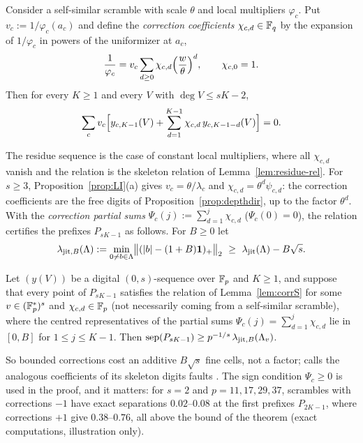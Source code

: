 \begin{lemma}\label{lem:corrS}
Consider a self-similar scramble with scale $\theta$ and local multipliers $\varphi_c$. Put $v_c:=1/\varphi_c(a_c)$ and define the \emph{correction coefficients} $\chi_{c,d}\in\mathbb{F}_q$ by the expansion of $1/\varphi_c$ in powers of the uniformizer at $a_c$,
\[
\frac1{\varphi_c}=v_c\sum_{d\ge0}\chi_{c,d}\Bigl(\frac w\theta\Bigr)^d,\qquad\chi_{c,0}=1 .
\]
Then for every $K\ge1$ and every $V$ with $\deg V\le sK-2$,
\[
\sum_cv_c\Bigl[y_{c,K-1}(V)+\sum_{d=1}^{K-1}\chi_{c,d}\,y_{c,K-1-d}(V)\Bigr]=0 .
\]
\end{lemma}
The residue sequence is the case of constant local multipliers, where all $\chi_{c,d}$ vanish and the relation is the skeleton relation of Lemma~\ref{lem:residue-rel}. For $s\ge3$, Proposition~\ref{prop:LI}(a) gives $v_c=\theta/\lambda_c$ and $\chi_{c,d}=\theta^d\psi_{c,d}$: the correction coefficients are the free digits of Proposition~\ref{prop:depthdir}, up to the factor $\theta^d$. With the \emph{correction partial sums} $\Psi_c(j):=\sum_{d=1}^j\chi_{c,d}$ ($\Psi_c(0)=0$), the relation certifies the prefixes $P_{sK-1}$ as follows. For $B\ge0$ let
\[
\ljitB(\Lambda):=\min_{0\ne b\in\Lambda}\bigl\|(|b|-(1+B)\mathbf 1)_+\bigr\|_2\ \ge\ \ljit(\Lambda)-B\sqrt s .
\]

\begin{theorem}\label{thm:corrected}
Let $(y(V))$ be a digital $(0,s)$-sequence over $\mathbb{F}_p$ and $K\ge1$, and suppose that every point of $P_{sK-1}$ satisfies the relation of Lemma~\ref{lem:corrS} for some $v\in(\mathbb{F}_p^*)^s$ and $\chi_{c,d}\in\mathbb{F}_p$ (not necessarily coming from a self-similar scramble), where the centred representatives of the partial sums $\Psi_c(j)=\sum_{d=1}^j\chi_{c,d}$ lie in $[0,B]$ for $1\le j\le K-1$. Then $\operatorname{sep}(P_{sK-1})\ge p^{-1/s}\,\lambda_{\mathrm{jit},B}(\Lambda_v)$.
\end{theorem}
So bounded corrections cost an additive $B\sqrt s$ fine cells, not a factor; \cite{Gru26geo} calls the analogous coefficients of its skeleton digits faults%
. The sign condition $\Psi_c\ge0$ is used in the proof, and it matters: for $s=2$ and $p=11,17,29,37$, scrambles with corrections $-1$ have exact separations $0.02$--$0.08$ at the first prefixes $P_{2K-1}$, where corrections $+1$ give $0.38$--$0.76$, all above the bound of the theorem (exact computations, illustration only).

